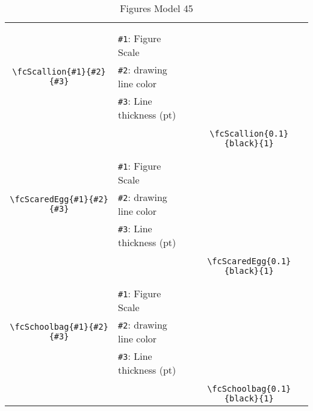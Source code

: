\documentclass[x11names]{article}
\begin{document}
\begin{table}[H]
\begin{tabular}{|c|l|c|}
	&&\multirow{5}{*}{\fcScallion{0.1}{black}{1}}\\	&&\\	&\verb|#1|: Figure Scale &\\	\verb|\fcScallion{#1}{#2}{#3}|&	\verb|#2|: drawing line color &\\	&\verb|#3|: Line thickness (pt) &\\ &&\\&&	\verb|\fcScallion{0.1}{black}{1}|\\\hline 	
	&&\multirow{5}{*}{\fcScaredEgg{0.1}{black}{1}}\\	&&\\	&\verb|#1|: Figure Scale &\\	\verb|\fcScaredEgg{#1}{#2}{#3}|&	\verb|#2|: drawing line color &\\	&\verb|#3|: Line thickness (pt) &\\ &&\\&&	\verb|\fcScaredEgg{0.1}{black}{1}|\\\hline 	
	&&\multirow{5}{*}{\fcSchoolbag{0.1}{black}{1}}\\	&&\\	&\verb|#1|: Figure Scale &\\	\verb|\fcSchoolbag{#1}{#2}{#3}|&	\verb|#2|: drawing line color &\\	&\verb|#3|: Line thickness (pt) &\\ &&\\&&	\verb|\fcSchoolbag{0.1}{black}{1}|\\\hline 	\hline\end{tabular}\caption{Figures Model 45}\label{tab45}\end{table}
\end{document}
